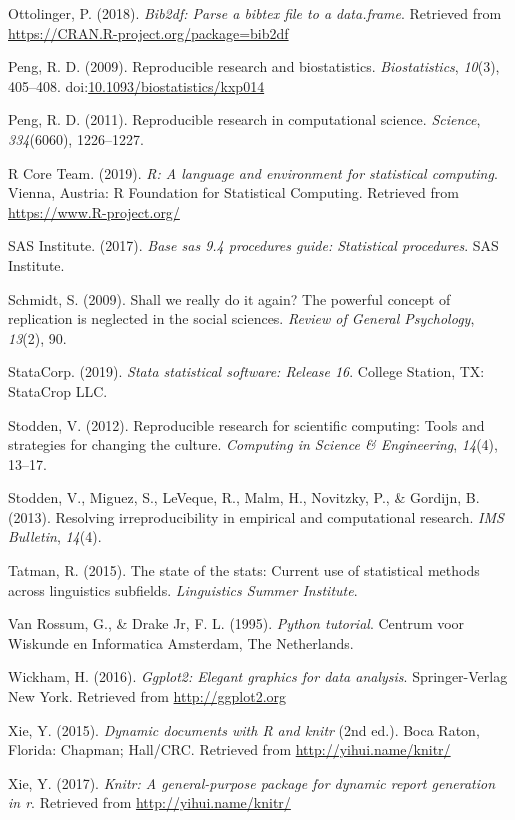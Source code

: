 \documentclass[
  english,
  ,man]{apa6}
\newlength{\cslhangindent}
\newenvironment{cslreferences}%
  {\setlength{\parindent}{0pt}%
  \everypar{\setlength{\hangindent}{\cslhangindent}}\ignorespaces}%
  {\par}
\begin{document}
\begin{cslreferences}
\leavevmode\hypertarget{ref-bib2df}{}%
Ottolinger, P. (2018). \emph{Bib2df: Parse a bibtex file to a data.frame}. Retrieved from \url{https://CRAN.R-project.org/package=bib2df}

\leavevmode\hypertarget{ref-peng2009}{}%
Peng, R. D. (2009). Reproducible research and biostatistics. \emph{Biostatistics}, \emph{10}(3), 405--408. doi:\href{https://doi.org/10.1093/biostatistics/kxp014}{10.1093/biostatistics/kxp014}

\leavevmode\hypertarget{ref-peng2011}{}%
Peng, R. D. (2011). Reproducible research in computational science. \emph{Science}, \emph{334}(6060), 1226--1227.

\leavevmode\hypertarget{ref-rpro}{}%
R Core Team. (2019). \emph{R: A language and environment for statistical computing}. Vienna, Austria: R Foundation for Statistical Computing. Retrieved from \url{https://www.R-project.org/}

\leavevmode\hypertarget{ref-sas2017base}{}%
SAS Institute. (2017). \emph{Base sas 9.4 procedures guide: Statistical procedures}. SAS Institute.

\leavevmode\hypertarget{ref-schmidt2009}{}%
Schmidt, S. (2009). Shall we really do it again? The powerful concept of replication is neglected in the social sciences. \emph{Review of General Psychology}, \emph{13}(2), 90.

\leavevmode\hypertarget{ref-stata}{}%
StataCorp. (2019). \emph{Stata statistical software: Release 16}. College Station, TX: StataCrop LLC.

\leavevmode\hypertarget{ref-stodden2012}{}%
Stodden, V. (2012). Reproducible research for scientific computing: Tools and strategies for changing the culture. \emph{Computing in Science \& Engineering}, \emph{14}(4), 13--17.

\leavevmode\hypertarget{ref-stodden2013}{}%
Stodden, V., Miguez, S., LeVeque, R., Malm, H., Novitzky, P., \& Gordijn, B. (2013). Resolving irreproducibility in empirical and computational research. \emph{IMS Bulletin}, \emph{14}(4).

\leavevmode\hypertarget{ref-tatman2015}{}%
Tatman, R. (2015). The state of the stats: Current use of statistical methods across linguistics subfields. \emph{Linguistics Summer Institute}.

\leavevmode\hypertarget{ref-van1995python}{}%
Van Rossum, G., \& Drake Jr, F. L. (1995). \emph{Python tutorial}. Centrum voor Wiskunde en Informatica Amsterdam, The Netherlands.

\leavevmode\hypertarget{ref-ggplot2}{}%
Wickham, H. (2016). \emph{Ggplot2: Elegant graphics for data analysis}. Springer-Verlag New York. Retrieved from \url{http://ggplot2.org}

\leavevmode\hypertarget{ref-knitr}{}%
Xie, Y. (2015). \emph{Dynamic documents with R and knitr} (2nd ed.). Boca Raton, Florida: Chapman; Hall/CRC. Retrieved from \url{http://yihui.name/knitr/}

\leavevmode\hypertarget{ref-knitrmanual}{}%
Xie, Y. (2017). \emph{Knitr: A general-purpose package for dynamic report generation in r}. Retrieved from \url{http://yihui.name/knitr/}
\end{cslreferences}
\end{document}
